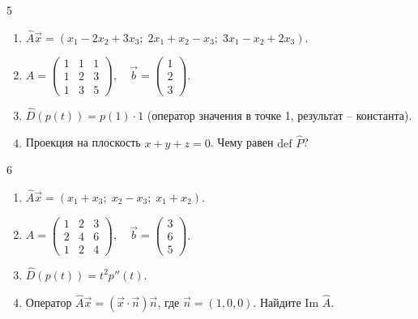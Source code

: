 \documentclass[12pt,a4paper]{article}
\theoremstyle{plain}
\theoremstyle{definition}
\begin{document}
\begin{taskbox}{5}
    \begin{enumerate}
        \item $\hat{A}\vec{x} = (x_1 - 2x_2 + 3x_3; \; 2x_1 + x_2 - x_3; \; 3x_1 - x_2 + 2x_3)$.
        \item $A = \begin{pmatrix} 1 & 1 & 1 \\ 1 & 2 & 3 \\ 1 & 3 & 5 \end{pmatrix}, \quad \vec{b} = \begin{pmatrix} 1 \\ 2 \\ 3 \end{pmatrix}$.
        \item $\hat{D}(p(t)) = p(1) \cdot 1$ (оператор значения в точке 1, результат -- константа).
        \item Проекция на плоскость $x+y+z=0$. Чему равен $\text{def } \hat{P}$?
    \end{enumerate}
\end{taskbox}

\begin{taskbox}{6}
    \begin{enumerate}
        \item $\hat{A}\vec{x} = (x_1 + x_3; \; x_2 - x_3; \; x_1 + x_2)$.
        \item $A = \begin{pmatrix} 1 & 2 & 3 \\ 2 & 4 & 6 \\ 1 & 2 & 4 \end{pmatrix}, \quad \vec{b} = \begin{pmatrix} 3 \\ 6 \\ 5 \end{pmatrix}$.
        \item $\hat{D}(p(t)) = t^2 p''(t)$.
        \item Оператор $\hat{A}\vec{x} = (\vec{x} \cdot \vec{n})\vec{n}$, где $\vec{n}=(1,0,0)$. Найдите $\text{Im } \hat{A}$.
    \end{enumerate}
\end{taskbox}
\end{document}
